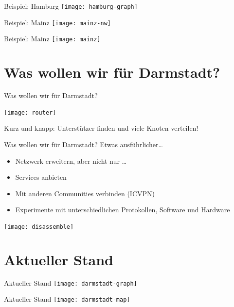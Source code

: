 \documentclass{beamer}
\begin{document}
\begin{frame}{Beispiel: Hamburg}
\vfill
\centering
\texttt{[image: hamburg-graph]}
\vfill
\end{frame}

\begin{frame}{Beispiel: Mainz}
\vfill
\centering
\texttt{[image: mainz-nw]}
\vfill
\end{frame}

\begin{frame}{Beispiel: Mainz}
\vfill
\centering
\texttt{[image: mainz]}
\vfill
\end{frame}


\section{Was wollen wir für Darmstadt?}
\begin{frame}{Was wollen wir für Darmstadt?}
\begin{center}
\vfill
\texttt{[image: router]}
\end{center}

\vfill
Kurz und knapp: Unterstützer finden und viele Knoten verteilen!
\vfill
\end{frame}


\begin{frame}{Was wollen wir für Darmstadt?}
\vfill
Etwas ausführlicher\ldots
\begin{itemize}
\pause\item Netzwerk erweitern\pause, aber nicht nur \ldots
\pause\item Services anbieten
\pause\item Mit anderen Communities verbinden (ICVPN)
\pause\item Experimente mit unterschiedlichen Protokollen, Software und Hardware
\end{itemize}
\begin{center}
\vfill
\texttt{[image: disassemble]}
\end{center}
\vfill
\end{frame}


\section{Aktueller Stand}
\begin{frame}{Aktueller Stand}
\vfill
\centering
\texttt{[image: darmstadt-graph]}
\vfill
\end{frame}

\begin{frame}{Aktueller Stand}
\vfill
\centering
\texttt{[image: darmstadt-map]}
\vfill
\end{frame}
\end{document}
